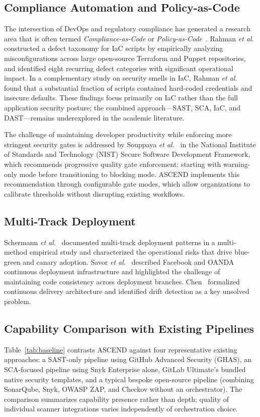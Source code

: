 \documentclass{ieeeaccess}
\begin{document}
\subsection{Compliance Automation and Policy-as-Code}
The intersection of DevOps and regulatory compliance has generated a research area that is often termed \emph{Compliance-as-Code} or \emph{Policy-as-Code}~\cite{sandall2018opa}. Rahman \emph{et al.}~\cite{rahman2020source} constructed a defect taxonomy for IaC scripts by empirically analyzing misconfigurations across large open-source Terraform and Puppet repositories, and identified eight recurring defect categories with significant operational impact. In a complementary study on security smells in IaC, Rahman \emph{et al.}~\cite{rahman2019seven} found that a substantial fraction of scripts contained hard-coded credentials and insecure defaults. These findings focus primarily on IaC rather than the full application security posture; the combined approach---SAST, SCA, IaC, and DAST---remains underexplored in the academic literature.

The challenge of maintaining developer productivity while enforcing more stringent security gates is addressed by Souppaya \emph{et al.}~\cite{souppaya2022ssdf} in the National Institute of Standards and Technology (NIST) Secure Software Development Framework, which recommends progressive quality gate enforcement: starting with warning-only mode before transitioning to blocking mode. ASCEND implements this recommendation through configurable gate modes, which allow organizations to calibrate thresholds without disrupting existing workflows.

\subsection{Multi-Track Deployment}
Schermann \emph{et al.}~\cite{schermann2018doing} documented multi-track deployment patterns in a multi-method empirical study and characterized the operational risks that drive blue-green and canary adoption. Savor \emph{et al.}~\cite{savor2016continuous} described Facebook and OANDA continuous deployment infrastructure and highlighted the challenge of maintaining code consistency across deployment branches. Chen~\cite{chen2015continuous} formalized continuous delivery architecture and identified drift detection as a key unsolved problem.

\subsection{Capability Comparison with Existing Pipelines}
Table~\ref{tab:baseline} contrasts ASCEND against four representative existing approaches: a SAST-only pipeline using GitHub Advanced Security (GHAS), an SCA-focused pipeline using Snyk Enterprise alone, GitLab Ultimate's bundled native security templates, and a typical bespoke open-source pipeline (combining SonarQube, Snyk, OWASP ZAP, and Checkov without an orchestrator). The comparison summarizes capability presence rather than depth; quality of individual scanner integrations varies independently of orchestration choice.
\end{document}
